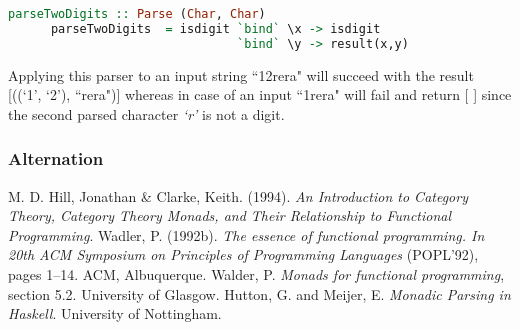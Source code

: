 \documentclass[a4paper, onecolumn]{article}
\begin{document}
    \begin{tcolorbox}
    \begin{lstlisting}[language=Haskell]
      parseTwoDigits :: Parse (Char, Char)
      parseTwoDigits  = isdigit `bind` \x -> isdigit 
                                `bind` \y -> result(x,y)
    \end{lstlisting}
    \end{tcolorbox}
    
    Applying this parser to an input string ``12rera" will succeed with the result [((`1', `2'), ``rera")] whereas in case of an input ``1rera" will fail and return [ ] since the second parsed character \textit{`r'} is not a digit. 
    
    
    
    
    \subsubsection{Alternation}
     
    \begin{thebibliography}{9}
    M. D. Hill, Jonathan & Clarke, Keith. (1994). \textit{An Introduction to Category Theory, Category Theory Monads, and Their Relationship to Functional Programming}.
    Wadler, P. (1992b). \textit{The essence of functional programming. In
    20th ACM Symposium on Principles of Programming Languages}
    (POPL’92), pages 1–14. ACM, Albuquerque.
    Walder, P. \textit{Monads for functional programming}, section 5.2. University of Glasgow. 
    Hutton, G. and Meijer, E. \textit{Monadic Parsing in Haskell}. University of Nottingham.
    \end{thebibliography}
    
\end{document}
